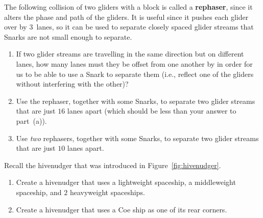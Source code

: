 \begin{multicols}{2}
	
	\begin{problem}\label{exer:rephaser} 
		The following collision of two gliders with a block is called a \textbf{rephaser}, since it alters the phase and path of the gliders. It is useful since it pushes each glider over by $3$~lanes, so it can be used to separate closely spaced glider streams that Snarks are not small enough to separate.
		
		\begin{center}
		\end{center}
		
		\begin{enumerate}[label=\bf\color{ocre}(\alph*)]
			\item If two glider streams are travelling in the same direction but on different lanes, how many lanes must they be offset from one another by in order for us to be able to use a Snark to separate them (i.e., reflect one of the gliders without interfering with the other)?
			
			\item Use the rephaser, together with some Snarks, to separate two glider streams that are just $16$ lanes apart (which should be less than your answer to part~(a)).
			
			\item Use \emph{two} rephasers, together with some Snarks, to separate two glider streams that are just $10$ lanes apart.
		\end{enumerate}
	\end{problem}
	
	
	\mfilbreak
	
	
	\begin{problem}\label{exer:hivenudger_modify}
		Recall the hivenudger that was introduced in Figure~\ref{fig:hivenudger}.\smallskip
		
		\begin{enumerate}[label=\bf\color{ocre}(\alph*)]
			\item {} Create a hivenudger that uses a lightweight spaceship, a middleweight spaceship, and $2$ heavyweight spaceships.
			
			\item {} Create a hivenudger that uses a Coe ship as one of its rear corners.
			

\end{enumerate}
\end{problem}
\end{multicols}
